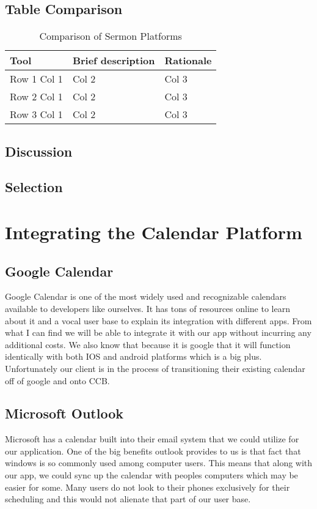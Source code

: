\documentclass[letterpaper,10pt,draftclsnofoot,onecolumn,titlepage]{IEEEtran}
\begin{document}
	\subsection{Table Comparison}
	\begin{table}[ht]
	\caption{Comparison of Sermon Platforms}
	\begin{center}
	\begin{tabular} { | m{3cm} | m{5cm} | m{5cm} | }
	\hline\hline
	Tool & Brief description & Rationale \\ [0.5ex]
	\hline
	Row 1 Col 1 & Col 2 & Col 3 \\
	\hline
	Row 2 Col 1 & Col 2 & Col 3 \\
	\hline
	Row 3 Col 1 & Col 2 & Col 3 \\
	\hline
	\end{tabular}
	\end{center}
	\end{table}
	\subsection{Discussion}
	\subsection{Selection}

	\section{Integrating the Calendar Platform}
	\subsection{Google Calendar}
	Google Calendar is one of the most widely used and recognizable calendars available to developers like ourselves. It has tons of resources online to learn about it and a vocal user base to explain its integration with different apps. From what I can find we will be able to integrate it with our app without incurring any additional costs. We also know that because it is google that it will function identically with both IOS and android platforms which is a big plus. Unfortunately our client is in the process of transitioning their existing calendar off of google and onto CCB.
	\subsection{Microsoft Outlook}
	Microsoft has a calendar built into their email system that we could utilize for our application. One of the big benefits outlook provides to us is that fact that windows is so commonly used among computer users. This means that along with our app, we could sync up the calendar with peoples computers which may be easier for some. Many users do not look to their phones exclusively for their scheduling and this would not alienate that part of our user base.
\end{document}
